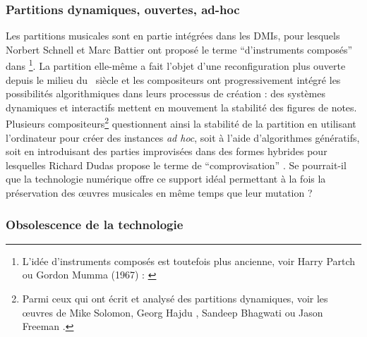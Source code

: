 \subsubsection{Partitions dynamiques, ouvertes, ad-hoc}
\label{sec:ephemeral:longevity_stability:dynamic_scores}

\noindent Les partitions musicales sont en partie intégrées dans les \glspl{DMI}, pour lesquels Norbert Schnell et Marc Battier ont proposé le terme ``d'instruments composés'' dans \cite{schnell_introducing_2002}\footnote{L'idée d'instruments composés est toutefois plus ancienne, voir Harry Partch ou Gordon Mumma (1967) : \cite{mumma_creative_1967}}. La partition elle-même a fait l'objet d'une reconfiguration plus ouverte depuis le milieu du ~siècle et les compositeurs ont progressivement intégré les possibilités algorithmiques dans leurs processus de création : des systèmes dynamiques et interactifs mettent en mouvement la stabilité des figures de notes. Plusieurs compositeurs\footnote{Parmi ceux qui ont écrit et analysé des partitions dynamiques, voir les œuvres de Mike Solomon, Georg Hajdu \cite{hajdu_disposable_2016}, Sandeep Bhagwati \cite{bhagwati_vexations_2017} ou Jason Freeman \cite{freeman_extreme_2008}.} questionnent ainsi la stabilité de la partition en utilisant l'ordinateur pour créer des instances \textit{ad hoc}, soit à l'aide d'algorithmes génératifs, soit en introduisant des parties improvisées dans des formes hybrides pour lesquelles Richard Dudas propose le terme de ``comprovisation'' \cite{dudas_comprovisation:_2010}. Se pourrait-il que la technologie numérique offre ce support idéal permettant à la fois la préservation des œuvres musicales en même temps que leur mutation ?

\subsubsection{Obsolescence de la technologie}

